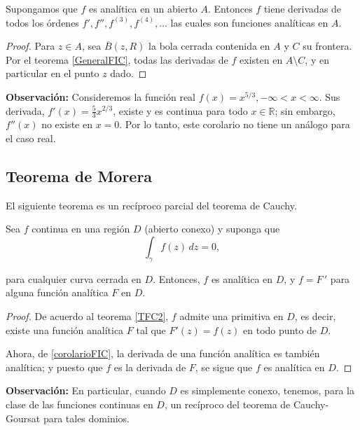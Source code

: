 \begin{corolario}\label{corolarioFIC}
Supongamos que $f$ es analítica en un abierto $A$. Entonces $f$ tiene derivadas de todos los órdenes $f',f'',f^{(3)}, f^{(4)},\dots$ las cuales son funciones analíticas en $A$.
\end{corolario}

\begin{proof}
Para $z \in A$, sea $\overline{B}(z,R)$ la bola cerrada contenida en $A$ y $C$ su frontera. Por el teorema \ref{GeneralFIC}, todas las derivadas de $f$ existen en $A\setminus C$, y en particular en el punto $z$ dado.
\end{proof}

\textbf{Observación:} Consideremos la función real $f(x) = x^{5/3}, - \infty < x < \infty$. Sus derivada, $f'(x) = \frac{5}{3} x^{2/3}$, existe y es continua para todo $x \in \mathbb{R}$; sin embargo, $f''(x)$ no existe en $x = 0$. Por lo tanto, este corolario no tiene un análogo para el caso real.

\subsection{Teorema de Morera}

El siguiente teorema es un recíproco parcial del teorema de Cauchy.

\begin{teorema}[de Morera]
Sea $f$ continua en una región $D$ (abierto conexo) y suponga que 
$$\int_{\gamma} f(z) \,dz = 0,$$

para cualquier curva cerrada en $D$. Entonces, $f$ es analítica en $D$, y $f = F\,'$ para alguna función analítica $F$ en $D$.
\end{teorema}

\begin{proof}
De acuerdo al teorema \ref{TFC2}, $f$ admite una primitiva en $D$, es decir, existe una función analítica $F$ tal que $F'(z) = f(z)$ en todo punto de $D$. 

Ahora, de \ref{corolarioFIC}, la derivada de una función analítica es también analítica; y puesto que $f$ es la derivada de $F$, se sigue que $f$ es analítica en $D$.

\end{proof}

\textbf{Observación:} En particular, cuando $D$ es simplemente conexo, tenemos, para la clase de las funciones continuas en $D$, un recíproco del teorema de Cauchy-Goursat para tales dominios.


